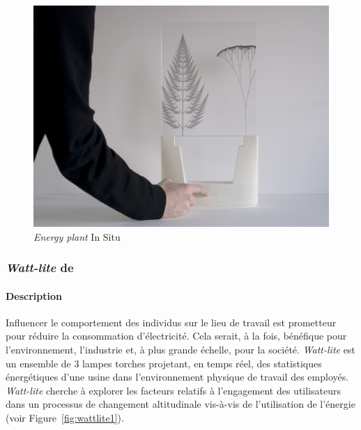 \documentclass[10pt,a5paper,twoside]{article}
\begin{document}
\begin{figure}
\centering
\includegraphics[]{images/energyplant-screenshot2.jpg}
\caption{\emph{Energy plant} In Situ}\label{fig:energyplant2}
\end{figure}

\subsubsection{\emph{Watt-lite} de
\citet{jonsson2010watt}}\label{watt-lite-de-jonsson2010watt}

\paragraph{Description}\label{description-10}

Influencer le comportement des individus sur le lieu de travail est
prometteur pour réduire la consommation d'électricité. Cela serait, à la
fois, bénéfique pour l'environnement, l'industrie et, à plus grande
échelle, pour la société. \emph{Watt-lite} est un ensemble de 3 lampes
torches projetant, en temps réel, des statistiques énergétiques d'une
usine dans l'environnement physique de travail des employés.
\emph{Watt-lite} cherche à explorer les facteurs relatifs à l'engagement
des utilisateurs dans un processus de changement altitudinale vis-à-vis
de l'utilisation de l'énergie (voir Figure~\ref{fig:wattlite1}).
\end{document}
